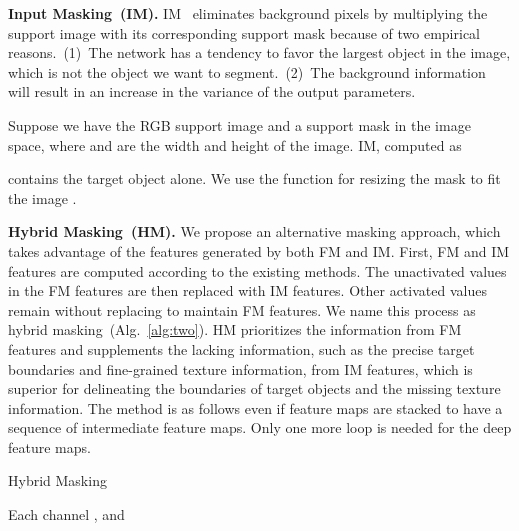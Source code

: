 \documentclass[runningheads]{llncs}
\begin{document}
\noindent \textbf{Input Masking~(IM).} IM~\cite{OSLSM} eliminates background pixels by multiplying the support image with its corresponding support mask because of two empirical reasons.~(1)~The network has a tendency to favor the largest object in the image, which is not the object we want to segment.~(2)~The background information will result in an increase in the variance of the output parameters.


Suppose we have the RGB support image 
and a support mask  in the image space, where  and  are the width and height of the image. IM, computed as

contains the target object alone. We use the function  for resizing the mask  to fit the image .


\noindent \textbf{Hybrid Masking~(HM).}
We propose an alternative masking approach, which takes advantage of the features generated by both FM and IM.
First, FM and IM features are computed according to the existing methods. The unactivated values in the FM features are then replaced with IM features. Other activated values remain without replacing to maintain FM features. We name this process as hybrid masking~(Alg.~\ref{alg:two}).
HM prioritizes the information from FM features and supplements the lacking information, such as the precise target boundaries and fine-grained texture information, from IM features, which is superior for delineating the boundaries of target objects and the missing texture information. The method is as follows even if feature maps are stacked to have a sequence of intermediate feature maps. Only one more loop is needed for the deep feature maps.

\vspace{-6mm}
\begin{algorithm}

\caption{Hybrid Masking}\label{alg:two}

Each channel ,    and   

\end{algorithm}
\vspace{-6mm}
\end{document}
